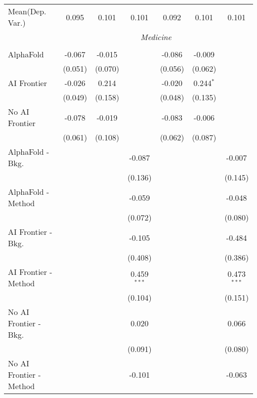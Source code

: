 \begin{tabular}{lcccccc}
Mean(Dep. Var.) & 0.095 & 0.101 & 0.101 & 0.092 & 0.101 & 0.101 \\
 & \multicolumn{6}{c}{\textit{Medicine}} \\ \\
   AlphaFold               & -0.067  & -0.015  &               & -0.086  & -0.009      &   \\   
                           & (0.051) & (0.070) &               & (0.056) & (0.062)     &   \\   
   AI Frontier             & -0.026  & 0.214   &               & -0.020  & 0.244$^{*}$ &   \\   
                           & (0.049) & (0.158) &               & (0.048) & (0.135)     &   \\   
   No AI Frontier          & -0.078  & -0.019  &               & -0.083  & -0.006      &   \\   
                           & (0.061) & (0.108) &               & (0.062) & (0.087)     &   \\   
   AlphaFold - Bkg.        &         &         & -0.087        &         &             & -0.007\\   
                           &         &         & (0.136)       &         &             & (0.145)\\   
   AlphaFold - Method      &         &         & -0.059        &         &             & -0.048\\   
                           &         &         & (0.072)       &         &             & (0.080)\\   
   AI Frontier - Bkg.      &         &         & -0.105        &         &             & -0.484\\   
                           &         &         & (0.408)       &         &             & (0.386)\\   
   AI Frontier - Method    &         &         & 0.459$^{***}$ &         &             & 0.473$^{***}$\\   
                           &         &         & (0.104)       &         &             & (0.151)\\   
   No AI Frontier - Bkg.   &         &         & 0.020         &         &             & 0.066\\   
                           &         &         & (0.091)       &         &             & (0.080)\\   
   No AI Frontier - Method &         &         & -0.101        &         &             & -0.063\\   

\end{tabular}
